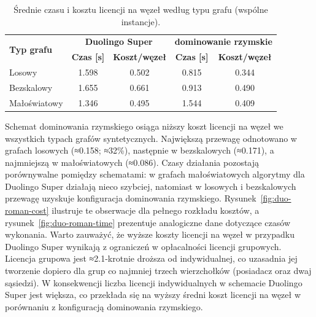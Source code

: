 \begin{table}[H]
  \centering
  \caption{Średnie czasu i kosztu licencji na węzeł według typu grafu (wspólne instancje).}
  \label{tab:duo-roman-graph}
  \begin{tabular}{lcccc}
    \toprule
    \multirow{2}{*}{\textbf{Typ grafu}} & \multicolumn{2}{c}{\textbf{Duolingo Super}} & \multicolumn{2}{c}{\textbf{dominowanie rzymskie}}                                            \\
                                        & \textbf{Czas [s]}                           & \textbf{Koszt/węzeł}                              & \textbf{Czas [s]} & \textbf{Koszt/węzeł} \\
    \midrule
    Losowy                              & 1.598                                       & 0.502                                             & 0.815             & 0.344                \\
    Bezskalowy                          & 1.655                                       & 0.661                                             & 0.913             & 0.490                \\
    Małoświatowy                        & 1.346                                       & 0.495                                             & 1.544             & 0.409                \\
    \bottomrule
  \end{tabular}
\end{table}

Schemat dominowania rzymskiego osiąga niższy koszt licencji na węzeł we wszystkich typach grafów syntetycznych. Największą przewagę odnotowano w grafach losowych (≈0.158; ≈32\%), następnie w bezskalowych (≈0.171), a najmniejszą w małoświatowych (≈0.086). Czasy działania pozostają porównywalne pomiędzy schematami: w grafach małoświatowych algorytmy dla Duolingo Super działają nieco szybciej, natomiast w losowych i bezskalowych przewagę uzyskuje konfiguracja dominowania rzymskiego. Rysunek~\ref{fig:duo-roman-cost} ilustruje te obserwacje dla pełnego rozkładu kosztów, a rysunek~\ref{fig:duo-roman-time} prezentuje analogiczne dane dotyczące czasów wykonania. Warto zauważyć, że wyższe koszty licencji na węzeł w przypadku Duolingo Super wynikają z ograniczeń w opłacalności licencji grupowych. Licencja grupowa jest ≈2.1-krotnie droższa od indywidualnej, co uzasadnia jej tworzenie dopiero dla grup co najmniej trzech wierzchołków (posiadacz oraz dwaj sąsiedzi). W konsekwencji liczba licencji indywidualnych w schemacie Duolingo Super jest większa, co przekłada się na wyższy średni koszt licencji na węzeł w porównaniu z konfiguracją dominowania rzymskiego.

